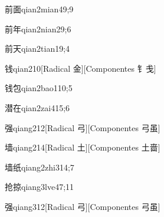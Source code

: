 \begin{verbete}{前面}{qian2mian4}{9;9}
\end{verbete}

\begin{verbete}{前年}{qian2nian2}{9;6}
\end{verbete}

\begin{verbete}{前天}{qian2tian1}{9;4}
\end{verbete}

\begin{verbete}{钱}{qian2}{10}[Radical 金][Componentes 钅戋]
\end{verbete}

\begin{verbete}{钱包}{qian2bao1}{10;5}
\end{verbete}

\begin{verbete}{潜在}{qian2zai4}{15;6}
\end{verbete}

\begin{verbete}{强}{qiang2}{12}[Radical 弓][Componentes 弓虽]
\end{verbete}

\begin{verbete}{墙}{qiang2}{14}[Radical 土][Componentes 土啬]
\end{verbete}

\begin{verbete}{墙纸}{qiang2zhi3}{14;7}
\end{verbete}

\begin{verbete}{抢掠}{qiang3lve4}{7;11}
\end{verbete}

\begin{verbete}{强}{qiang3}{12}[Radical 弓][Componentes 弓虽]
\end{verbete}

